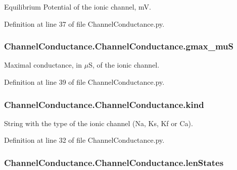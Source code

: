 Equilibrium Potential of the ionic channel, m\-V. 



Definition at line 37 of file Channel\-Conductance.\-py.

\hypertarget{class_channel_conductance_1_1_channel_conductance_a80a0238a90b30b411c9381f682d0aeec}{
\subsubsection[{gmax\-\_\-mu\-S}]{\setlength{\rightskip}{0pt plus 5cm}Channel\-Conductance.\-Channel\-Conductance.\-gmax\-\_\-mu\-S}}\label{class_channel_conductance_1_1_channel_conductance_a80a0238a90b30b411c9381f682d0aeec}


Maximal conductance, in $\mu$S, of the ionic channel. 



Definition at line 39 of file Channel\-Conductance.\-py.

\hypertarget{class_channel_conductance_1_1_channel_conductance_a7bf3e28aab2160014358cde589f2ec39}{
\subsubsection[{kind}]{\setlength{\rightskip}{0pt plus 5cm}Channel\-Conductance.\-Channel\-Conductance.\-kind}}\label{class_channel_conductance_1_1_channel_conductance_a7bf3e28aab2160014358cde589f2ec39}


String with the type of the ionic channel (Na, Ks, Kf or Ca). 



Definition at line 32 of file Channel\-Conductance.\-py.

\hypertarget{class_channel_conductance_1_1_channel_conductance_ae217799d13e5d225af048b7ba503fde1}{
\subsubsection[{len\-States}]{\setlength{\rightskip}{0pt plus 5cm}Channel\-Conductance.\-Channel\-Conductance.\-len\-States}}\label{class_channel_conductance_1_1_channel_conductance_ae217799d13e5d225af048b7ba503fde1}


